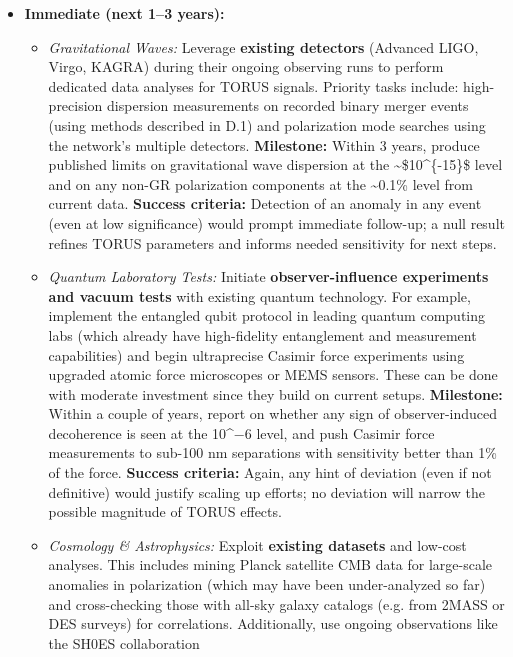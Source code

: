 \documentclass[
]{article}
\begin{document}
\begin{itemize}
\item
  \textbf{Immediate (next 1--3 years):}

  \begin{itemize}
  \item
    \emph{Gravitational Waves:} Leverage \textbf{existing detectors}
    (Advanced LIGO, Virgo, KAGRA) during their ongoing observing runs to
    perform dedicated data analyses for TORUS signals. Priority tasks
    include: high-precision dispersion measurements on recorded binary
    merger events (using methods described in D.1) and polarization mode
    searches using the network's multiple detectors. \textbf{Milestone:}
    Within 3 years, produce published limits on gravitational wave
    dispersion at the \textasciitilde\$10\^{}\{-15\}\$ level and on any
    non-GR polarization components at the \textasciitilde0.1\% level
    from current data. \textbf{Success criteria:} Detection of an
    anomaly in any event (even at low significance) would prompt
    immediate follow-up; a null result refines TORUS parameters and
    informs needed sensitivity for next steps.
  \item
    \emph{Quantum Laboratory Tests:} Initiate \textbf{observer-influence
    experiments and vacuum tests} with existing quantum technology. For
    example, implement the entangled qubit protocol in leading quantum
    computing labs (which already have high-fidelity entanglement and
    measurement capabilities) and begin ultraprecise Casimir force
    experiments using upgraded atomic force microscopes or MEMS sensors.
    These can be done with moderate investment since they build on
    current setups. \textbf{Milestone:} Within a couple of years, report
    on whether any sign of observer-induced decoherence is seen at the
    10\^{}−6 level, and push Casimir force measurements to sub-100 nm
    separations with sensitivity better than 1\% of the force.
    \textbf{Success criteria:} Again, any hint of deviation (even if not
    definitive) would justify scaling up efforts; no deviation will
    narrow the possible magnitude of TORUS effects.
  \item
    \emph{Cosmology \& Astrophysics:} Exploit \textbf{existing datasets}
    and low-cost analyses. This includes mining Planck satellite CMB
    data for large-scale anomalies in polarization (which may have been
    under-analyzed so far) and cross-checking those with all-sky galaxy
    catalogs (e.g. from 2MASS or DES surveys) for correlations.
    Additionally, use ongoing observations like the SH0ES collaboration

\end{itemize}
\end{itemize}
\end{document}
